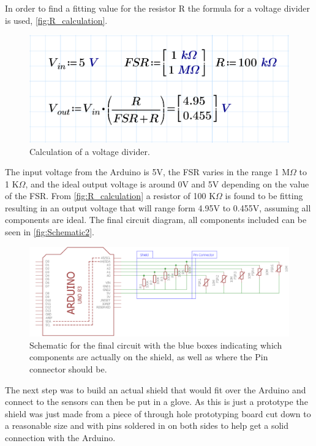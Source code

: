 In order to find a fitting value for the resistor R the formula for a voltage divider is used, \autoref{fig:R_calculation}.
\begin{figure}[H]
\centering
\includegraphics[scale=0.15]{Figure/R_calculation.png}
\caption{Calculation of a voltage divider.}
\label{fig:R_calculation}
\end{figure}

The input voltage from the Arduino is 5V, the FSR varies in the range 1 M$\Omega$ to 1 K$\Omega$, and the ideal output voltage is around 0V and 5V depending on the value of the FSR. From \autoref{fig:R_calculation} a resistor of 100 K$\Omega$ is found to be fitting resulting in an output voltage that will range form 4.95V to 0.455V, assuming all components are ideal. The final circuit diagram, all components included can be seen in \autoref{fig:Schematic2}. 
\begin{figure}[H]
\centering
\includegraphics[scale=0.5]{Figure/Schematic2.png}
\caption{Schematic for the final circuit with the blue boxes indicating which components are actually on the shield, as well as where the Pin connector should be.}
\label{fig:Schematic2}
\end{figure}

The next step was to build an actual shield that would fit over the Arduino and connect to the sensors can then be put in a glove. As this is just a prototype the shield was just made from a piece of through hole prototyping board cut down to a reasonable size and with pins soldered in on both sides to help get a solid connection with the Arduino.


